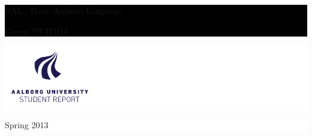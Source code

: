 %
%
%
%
	\thispagestyle{empty}

	\vspace*{\fill}

	\noindent \colorbox{black}{
		\parbox{\textwidth}{%
			\color{white}%
			\begin{center}
				\Huge{{\selectfont BAL - Basic Arduino Language}} %
			\end{center}
			\begin{center}
			\Large{\textsf{Group SW411f13}} %
			\end{center}
		}}

	\vfill

	\noindent \colorbox{white}{
		\begin{minipage}[b]{6.5cm}
		\begin{center}
			\includegraphics[width=150px]{billeder/aau_new_logo}
			\end{center}
			\vspace*{-20px}
		\end{minipage}
	} 
	\hfill  
	\colorbox{white}{ 
		\begin{minipage}[b]{3.5cm}	 
			\flushright
			{\large Spring 2013} \\
		\end{minipage}
	}

\clearpage
